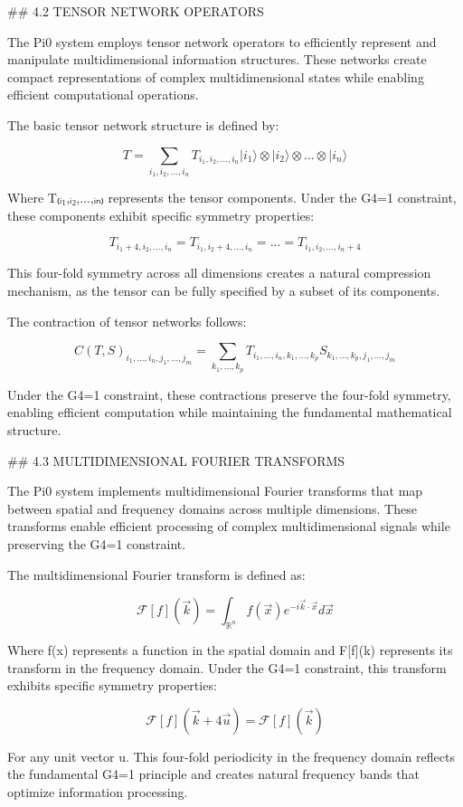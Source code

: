 ## 4.2 TENSOR NETWORK OPERATORS

The Pi0 system employs tensor network operators to efficiently represent and manipulate multidimensional information structures. These networks create compact representations of complex multidimensional states while enabling efficient computational operations.

The basic tensor network structure is defined by:

$$T = \sum_{i_1,i_2,...,i_n} T_{i_1,i_2,...,i_n} |i_1\rangle \otimes |i_2\rangle \otimes ... \otimes |i_n\rangle$$

Where T₍ᵢ₁,ᵢ₂,...,ᵢₙ₎ represents the tensor components. Under the G4=1 constraint, these components exhibit specific symmetry properties:

$$T_{i_1+4,i_2,...,i_n} = T_{i_1,i_2+4,...,i_n} = ... = T_{i_1,i_2,...,i_n+4}$$

This four-fold symmetry across all dimensions creates a natural compression mechanism, as the tensor can be fully specified by a subset of its components.

The contraction of tensor networks follows:

$$C(T,S)_{i_1,...,i_n,j_1,...,j_m} = \sum_{k_1,...,k_p} T_{i_1,...,i_n,k_1,...,k_p} S_{k_1,...,k_p,j_1,...,j_m}$$

Under the G4=1 constraint, these contractions preserve the four-fold symmetry, enabling efficient computation while maintaining the fundamental mathematical structure.

## 4.3 MULTIDIMENSIONAL FOURIER TRANSFORMS

The Pi0 system implements multidimensional Fourier transforms that map between spatial and frequency domains across multiple dimensions. These transforms enable efficient processing of complex multidimensional signals while preserving the G4=1 constraint.

The multidimensional Fourier transform is defined as:

$$\mathcal{F}[f](\vec{k}) = \int_{\mathbb{R}^n} f(\vec{x}) e^{-i\vec{k}\cdot\vec{x}} d\vec{x}$$

Where f(x⃗) represents a function in the spatial domain and F[f](k⃗) represents its transform in the frequency domain. Under the G4=1 constraint, this transform exhibits specific symmetry properties:

$$\mathcal{F}[f](\vec{k} + 4\vec{u}) = \mathcal{F}[f](\vec{k})$$

For any unit vector u⃗. This four-fold periodicity in the frequency domain reflects the fundamental G4=1 principle and creates natural frequency bands that optimize information processing.

